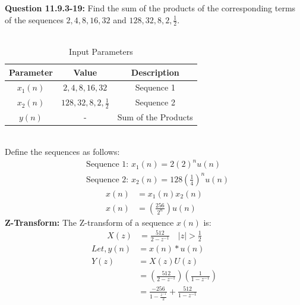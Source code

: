 \documentclass[journal,12pt,twocolumn]{IEEEtran}
\theoremstyle{remark}
\begin{document}
\title{}
\author{Sasa Mardi, EE23BTECH11222}
\date{}
\maketitle
\textbf{Question 11.9.3-19:} Find the sum of the products of the corresponding terms of the sequences $2, 4, 8, 16, 32$ and $128, 32, 8, 2, \frac{1}{2}$.\\
\\
\solution
\begin{table}[h!]
    \centering
    \caption{Input Parameters}
    \label{tab:1}
    \begin{tabular}{ | c | c | c | }
        \hline
        Parameter & Value & Description \\
        \hline
        $x_1(n)$ & $2, 4, 8, 16, 32$ &  Sequence 1 \\
        \hline
        $x_2(n)$ & $128, 32, 8, 2, \frac{1}{2}$ &  Sequence 2 \\
        \hline
        $y(n)$ & - &  Sum of the Products \\
        \hline
    \end{tabular}
\end{table}\\
Define the sequences as follows:\\
\begin{align}
&\text{Sequence 1: } x_1(n) = 2(2)^nu(n) \\
&\text{Sequence 2: } x_2(n) = 128\left(\frac{1}{4}\right)^nu(n)
\end{align}
\begin{align}
x(n) &= x_1(n)x_2(n) \\
x(n) &= \left(\frac{256}{2^{n}}\right)u(n)
\end{align}
\textbf{Z-Transform:}
The Z-transform of a sequence \( x(n) \) is:
\begin{align}
X(z) &= \frac{512}{2 - z^{-1}}    \quad |z| > \frac{1}{2}
\end{align}
\begin{align}
Let, y(n) &= x(n)*u(n) \\
 Y(z) &= X(z)U(z) \\
 &= \left(\frac{512}{2 - z^{-1}}\right)\left(\frac{1}{1 - z^{-1}}\right)\\
 &= \frac{-256}{1 - \frac{z^{-1}}{2}} + \frac{512}{1 - z^{-1}}
\end{align}
\end{document}
